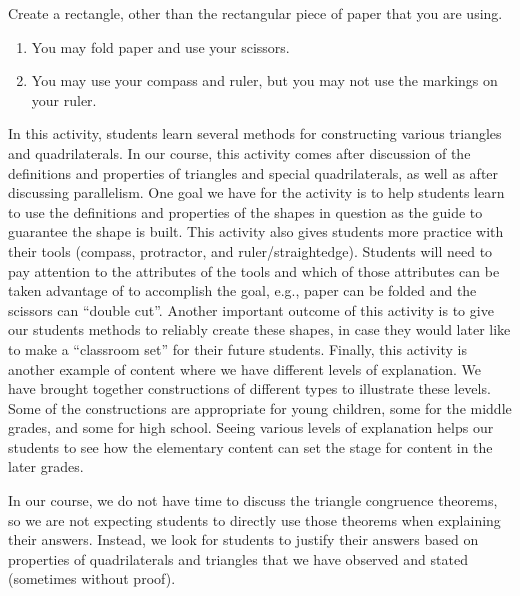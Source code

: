 \documentclass{ximera}
\begin{document}
\begin{problem}
Create a rectangle, other than the rectangular piece of paper that you are using.
\begin{enumerate}
\item You may fold paper and use your scissors.
\item You may use your compass and ruler, but you may not use the markings on your ruler.
\end{enumerate}
\end{problem}

\newpage
\begin{instructorNotes}
In this activity, students learn several methods for constructing various triangles and quadrilaterals.  In our course, this activity comes after discussion of the definitions and properties of triangles and special quadrilaterals, as well as after discussing parallelism.  One goal we have for the activity is to help students learn to use the definitions and properties of the shapes in question as the guide to guarantee the shape is built.  This activity also gives students more practice with their tools (compass, protractor, and ruler/straightedge).  Students will need to pay attention to the attributes of the tools and which of those attributes can be taken advantage of to accomplish the goal, e.g., paper can be folded and the scissors can “double cut”.  Another important outcome of this activity is to give our students methods to reliably create these shapes, in case they would later like to make a ``classroom set'' for their future students.  Finally, this activity is another example of content where we have different levels of explanation.  We have brought together constructions of different types to illustrate these levels.  Some of the constructions are appropriate for young children, some for the middle grades, and some for high school.  Seeing various levels of explanation helps our students to see how the elementary content can set the stage for content in the later grades.



In our course, we do not have time to discuss the triangle congruence theorems, so we are not expecting students to directly use those theorems when explaining their answers.  Instead, we look for students to justify their answers based on properties of quadrilaterals and triangles that we have observed and stated (sometimes without proof).

    
    
\end{instructorNotes}
\end{document}
